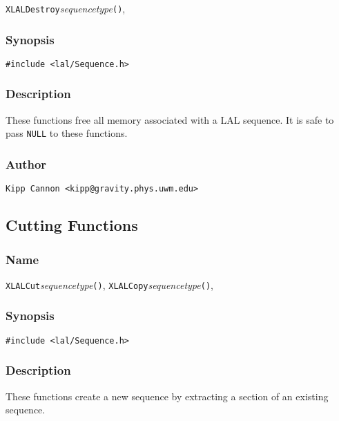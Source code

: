 \texttt{XLALDestroy}\textit{sequencetype}\texttt{()},

\subsubsection{Synopsis}

\begin{verbatim}
#include <lal/Sequence.h>
\end{verbatim}


\subsubsection{Description}

These functions free all memory associated with a LAL sequence.  It is safe
to pass \texttt{NULL} to these functions.

\subsubsection{Author}

\verb|Kipp Cannon <kipp@gravity.phys.uwm.edu>|


\subsection{Cutting Functions}

\subsubsection{Name}

\texttt{XLALCut}\textit{sequencetype}\texttt{()},
\texttt{XLALCopy}\textit{sequencetype}\texttt{()},

\subsubsection{Synopsis}

\begin{verbatim}
#include <lal/Sequence.h>
\end{verbatim}


\subsubsection{Description}

These functions create a new sequence by extracting a section of an
existing sequence.


